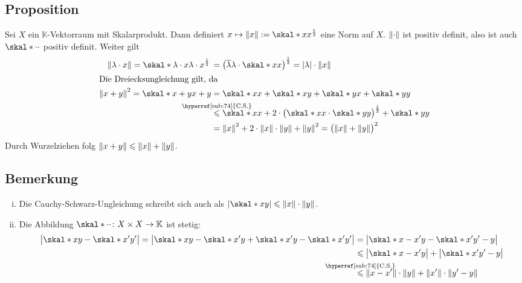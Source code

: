 \subsection[Proposition: Ein Skalarprodukt definiert eine Norm]{Proposition} %
\label{sub:75}
Sei $X$ ein $\mathds{K}$-Vektorraum mit Skalarprodukt. Dann definiert $x \mapsto \norm{x} := \skal*{x}{x}^{\frac{1}{2}}$ eine Norm auf $X$.
$\norm{\cdot }$ ist positiv definit, also ist auch $\skal*{\cdot}{\cdot}$ positiv definit. Weiter gilt
\begin{align*}
	\norm{\lambda \cdot x} = \skal*{\lambda \cdot x}{\lambda \cdot x}^{\frac{1}{2}} \,&= \enbrace*{\overline{\lambda} \lambda \cdot \skal*{x}{x}}^{\frac{1}{2}} 
	= \abs*{\lambda} \cdot \norm{x}    \\
	\intertext{Die Dreiecksungleichung gilt, da}
	\norm{x+y}^2 = \skal*{x+y}{x+y} &= \skal*{x}{x} + \skal*{x}{y} + \skal*{y}{x} + \skal*{y}{y} \\
	&\stackrel{\mathclap{\mbox{\scriptsize \hyperref[sub:74]{C.S.}}}}{\le} \skal*{x}{x} + 2 \cdot \enbrace[\big]{\skal*{x}{x} \cdot \skal*{y}{y}}^{\frac{1}{2}}
	+ \skal*{y}{y}  \\
	&= \norm{x}^2 + 2 \cdot \norm{x} \cdot \norm{y} + \norm{y}^2 = \enbrace[\big]{\norm{x} + \norm{y}}^2    
\end{align*}
Durch Wurzelziehen folg $\norm{x+y} \le \norm{x} + \norm{y}$. \bewende

\subsection[Bemerkungen über Cauchy-Schwarz und die Stetigkeit von $\skal*{\cdot}{\cdot}$]{Bemerkung} %
\label{sub:76}
\begin{enumerate}[(i)]
	\item Die Cauchy-Schwarz-Ungleichung schreibt sich auch als $\abs*{\skal*{x}{y}} \le \norm{x} \cdot \norm{y}$.
	\item Die Abbildung $\skal*{\cdot}{\cdot} \colon X \times X \to \mathds{K}$ ist stetig:
	\begin{align*}
		\abs[\big]{\skal*{x}{y}- \skal*{x'}{y'}} = \abs[\big]{\skal*{x}{y} -\skal*{x'}{y} + \skal*{x'}{y} -\skal*{x'}{y'}} &= \abs[\big]{\skal*{x-x'}{y} -\skal*{x'}{y'-y}}\\
		&\le \abs[\big]{\skal*{x-x'}{y}} + \abs[\big]{\skal*{x'}{y'-y}} \\
		&\stackrel{\mathclap{\mbox{\scriptsize \hyperref[sub:74]{C.S.}}}}{\le} \norm{x-x'} \cdot \norm{y} + \norm{x'} \cdot \norm{y'-y}    
	\end{align*}
\end{enumerate}

